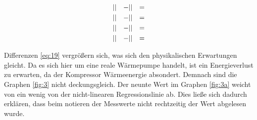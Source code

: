 \begin{subequations} \label{eq:19}
\begin{align}
    &\lvert\text{}\rvert &- &\lvert\text{}\rvert &= &\text{} \label{eq:19a}\\
    &\lvert\text{}\rvert &- &\lvert\text{}\rvert &= &\text{} \label{eq:19b}\\
    &\lvert\text{}\rvert &- &\lvert\text{}\rvert &= &\text{} \label{eq:19c}\\
    &\lvert\text{}\rvert &- &\lvert\text{}\rvert &= &\text{} \label{eq:19d}
\end{align}
\end{subequations}

\justifying Differenzen \eqref{eq:19} vergrößern sich, was sich den physikalischen Erwartungen gleicht. Da es sich hier um 
eine reale Wärmepumpe handelt, ist ein Energieverlust zu erwarten, da der Kompressor Wärmeenergie absondert. Demnach sind die Graphen \ref{fig:3}
nicht deckungsgleich. Der neunte Wert im Graphen \ref{fig:3a} weicht von ein wenig von der nicht-linearen Regressionslinie ab. Dies ließe sich
dadurch erklären, dass beim notieren der Messwerte nicht rechtzeitig der Wert abgelesen wurde. 


\newpage
\printbibliography


